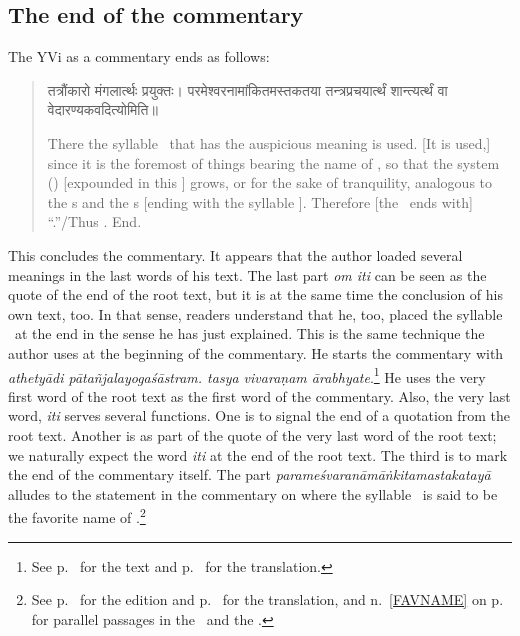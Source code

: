 \subsection{The end of the commentary}
The YVi as a commentary ends as follows:
\begin{quote}
{\dn तत्रौंकारो मंगलार्त्थः प्रयुक्तः। परमेश्वरनामांकितमस्तकतया तन्त्रप्रचयार्त्थं शा\-न्त्य\-र्त्थं वा वेदारण्यकवदित्योमिति॥}

There the syllable \OM\ that has the auspicious meaning is used. [It is used,] since it is the foremost of things bearing the name of \Isvara, so that the system (\tantra) [expounded in this \sastra] grows, or for the sake of tranquility, analogous to the \Veda s and the \Aranyaka s [ending with the syllable \OM]. Therefore [the \sastra\ ends with] ``\OM.''/Thus \OM. End.
\end{quote}
This concludes the commentary. It appears that the author loaded several meanings in the last words of his text. The last part \emph{om iti} can be seen as the quote of the end of the root text, but it is at the same time the conclusion of his own text, too. In that sense, readers understand that he, too, placed the syllable \OM\ at the end in the sense he has just explained. This is the same technique the author uses at the beginning of the commentary. He starts the commentary with \emph{athetyādi pātañjalayogaśāstram. tasya vivaraṇam ārabhyate}.\footnote{See p.~\pageref{FIRSTSTC} for the text and p.~\pageref{ATHAATHATRL} for the translation.} He uses the very first word of the root text as the first word of the commentary. Also, the very last word, \emph{iti} serves several functions. One is to signal the end of a quotation from the root text. Another is as part of the quote of the very last word of the root text; we naturally expect the word \emph{iti} at the end of the root text. The third is to mark the end of the commentary itself. The part \emph{parameśvaranāmāṅkitamastakatayā} alludes to the statement in the commentary on  where the syllable \OM\ is said to be the favorite name of \Isvara.\footnote{See p.~\pageref{FAVNAMEED} for the edition and p.~\pageref{FAVNAMETRL} for the translation, and n.~\ref{FAVNAME} on p.~\pageref{FAVNAME} for parallel passages in the \BAUBh\ and the \ChUBh.}

